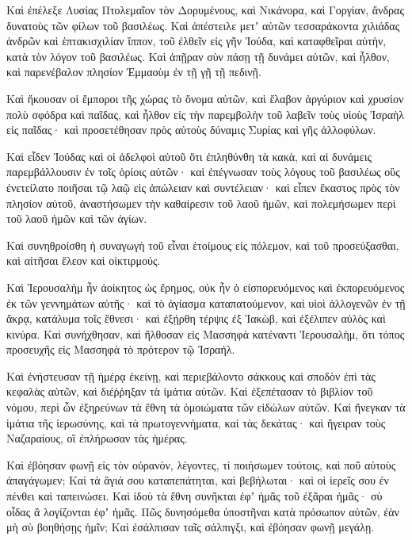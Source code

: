 {\par }{\PP {}Καὶ ἐπέλεξε Λυσίας Πτολεμαῖον τὸν Δορυμένους, καὶ Νικάνορα, καὶ Γοργίαν, ἄνδρας δυνατοὺς τῶν φίλων τοῦ βασιλέως.
Καὶ ἀπέστειλε μετʼ αὐτῶν τεσσαράκοντα χιλιάδας ἀνδρῶν καὶ ἑπτακισχιλίαν ἵππον, τοῦ ἐλθεῖν εἰς γῆν Ἰούδα, καὶ καταφθεῖραι αὐτὴν, κατὰ τὸν λόγον τοῦ βασιλέως.
Καὶ ἀπῇραν σὺν πάσῃ τῇ δυνάμει αὐτῶν, καὶ ἦλθον, καὶ παρενέβαλον πλησίον Ἐμμαοὺμ ἐν τῇ γῇ τῇ πεδινῇ.
\par }{\PP {}Καὶ ἤκουσαν οἱ ἔμποροι τῆς χώρας τὸ ὄνομα αὐτῶν, καὶ ἔλαβον ἀργύριον καὶ χρυσίον πολὺ σφόδρα καὶ παῖδας, καὶ ἦλθον εἰς τὴν παρεμβολὴν τοῦ λαβεῖν τοὺς υἱοὺς Ἰσραὴλ εἰς παῖδας· καὶ προσετέθησαν πρὸς αὐτοὺς δύναμις Συρίας καὶ γῆς ἀλλοφύλων.
\par }{\PP {}Καὶ εἶδεν Ἰούδας καὶ οἱ ἀδελφοὶ αὐτοῦ ὅτι ἐπληθύνθη τὰ κακὰ, καὶ αἱ δυνάμεις παρεμβάλλουσιν ἐν τοῖς ὁρίοις αὐτῶν· καὶ ἐπέγνωσαν τοὺς λόγους τοῦ βασιλέως οὓς ἐνετείλατο ποιῆσαι τῷ λαῷ εἰς ἀπώλειαν καὶ συντέλειαν·
καὶ εἶπεν ἕκαστος πρὸς τὸν πλησίον αὐτοῦ, ἀναστήσωμεν τὴν καθαίρεσιν τοῦ λαοῦ ἡμῶν, καὶ πολεμήσωμεν περὶ τοῦ λαοῦ ἡμῶν καὶ τῶν ἁγίων.
\par }{\PP {}Καὶ συνηθροίσθη ἡ συναγωγὴ τοῦ εἶναι ἑτοίμους εἰς πόλεμον, καὶ τοῦ προσεύξασθαι, καὶ αἰτῆσαι ἔλεον καὶ οἰκτιρμούς.
\par }{\PP {}Καὶ Ἱερουσαλὴμ ἦν ἀοίκητος ὡς ἔρημος, οὐκ ἦν ὁ εἰσπορευόμενος καὶ ἐκπορευόμενος ἐκ τῶν γεννημάτων αὐτῆς· καὶ τὸ ἁγίασμα καταπατούμενον, καὶ υἱοὶ ἀλλογενῶν ἐν τῇ ἄκρᾳ, κατάλυμα τοῖς ἔθνεσι· καὶ ἐξῄρθη τέρψις ἐξ Ἰακὼβ, καὶ ἐξέλιπεν αὐλὸς καὶ κινύρα.
Καὶ συνήχθησαν, καὶ ἤλθοσαν εἰς Μασσηφὰ κατέναντι Ἱερουσαλὴμ, ὅτι τόπος προσευχῆς εἰς Μασσηφὰ τὸ πρότερον τῷ Ἰσραήλ.
\par }{\PP {}Καὶ ἐνήστευσαν τῇ ἡμέρᾳ ἐκείνῃ, καὶ περιεβάλοντο σάκκους καὶ σποδὸν ἐπὶ τὰς κεφαλὰς αὐτῶν, καὶ διέῤῥηξαν τὰ ἱμάτια αὐτῶν.
Καὶ ἐξεπέτασαν τὸ βιβλίον τοῦ νόμου, περὶ ὧν ἐξηρεύνων τὰ ἔθνη τὰ ὁμοιώματα τῶν εἰδώλων αὐτῶν.
Καὶ ἤνεγκαν τὰ ἱμάτια τῆς ἱερωσύνης, καὶ τὰ πρωτογεννήματα, καὶ τὰς δεκάτας· καὶ ἤγειραν τοὺς Ναζαραίους, οἳ ἐπλήρωσαν τὰς ἡμέρας.
\par }{\PP {}Καὶ ἐβόησαν φωνῇ εἰς τὸν οὐρανὸν, λέγοντες, τί ποιήσωμεν τούτοις, καὶ ποῦ αὐτοὺς ἀπαγάγωμεν;
Καὶ τὰ ἅγιά σου καταπεπάτηται, καὶ βεβήλωται· καὶ οἱ ἱερεῖς σου ἐν πένθει καὶ ταπεινώσει.
Καὶ ἰδοὺ τὰ ἔθνη συνῆκται ἐφʼ ἡμᾶς τοῦ ἐξᾶραι ἡμᾶς· σὺ οἶδας ἃ λογίζονται ἐφʼ ἡμᾶς.
Πῶς δυνησόμεθα ὑποστῆναι κατὰ πρόσωπον αὐτῶν, ἐὰν μὴ σὺ βοηθήσῃς ἡμῖν;
Καὶ ἐσάλπισαν ταῖς σάλπιγξι, καὶ ἐβόησαν φωνῇ μεγάλῃ.
}
